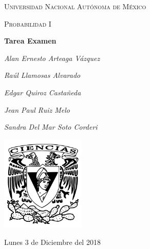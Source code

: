 \documentclass[11pt,a4paper]{report}
\begin{document}
	\begin{titlepage}
		\centering
		{\scshape\LARGE Universidad Nacional Autónoma de México \par}
		\vspace{1cm}
		{\scshape\Large Probabilidad I\par}
		\vspace{1.5cm}
		{\huge\bfseries Tarea Examen\par}
		\vspace{.5cm}

		{\Large\itshape Alan Ernesto Arteaga Vázquez \par}
		 \vspace{.5cm}
		{\Large\itshape Raúl Llamosas Alvarado \par}
		 \vspace{.5cm}
		{\Large\itshape Edgar Quiroz Castañeda \par}
	    \vspace{.5cm}
		{\Large\itshape Jean Paul Ruiz Melo\par}
		\vspace{.5cm}
		{\Large\itshape Sandra Del Mar Soto Corderi \par}

		\vfill
		 \includegraphics[width=0.3\textwidth]{escudo.png}
		\vfill

		{\large Lunes 3 de Diciembre del 2018 \par}
	\end{titlepage}

	\pagebreak
	\setlength{\voffset}{-0.75in}
	\setlength{\headsep}{5pt}
\end{document}
